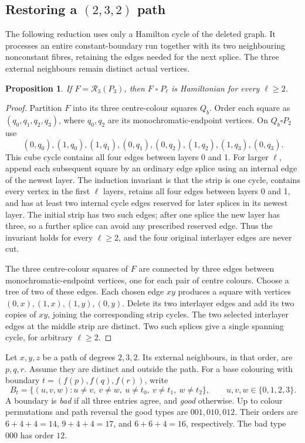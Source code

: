 \documentclass[11pt]{article}
\newtheorem{proposition}[theorem]{Proposition}
\theoremstyle{remark}
\newcommand{\R}{\mathcal R}
\numberwithin{equation}{section}
\numberwithin{table}{section}
\begin{document}
\subsection{\texorpdfstring{Restoring a $(2,3,2)$ path}{Restoring a (2,3,2) path}}
The following reduction uses only a Hamilton cycle of the deleted graph.
It processes an entire constant-boundary run together with its two
neighbouring nonconstant fibres, retaining the edges needed for the next
splice.  The three external neighbours remain distinct actual vertices.
\begin{proposition}\label{prop:badrun}
If $F=\R_3(P_3)$, then $F\mathbin{\square}P_\ell$ is Hamiltonian
for every $\ell\ge2$.
\end{proposition}
\begin{proof}
Partition $F$ into its three centre-colour squares $Q_b$.
Order each square as $(q_0,q_1,q_2,q_3)$, where $q_0,q_2$ are
its monochromatic-endpoint vertices. On $Q_b\square P_2$ use
\[
 (0,q_0),(1,q_0),(1,q_1),(0,q_1),
 (0,q_2),(1,q_2),(1,q_3),(0,q_3).
\]
This cube cycle contains all four edges between layers 0 and 1.
For larger $\ell$, append each subsequent square by an ordinary
edge splice using an internal edge of the newest layer.  The induction
invariant is that the strip is one cycle, contains every vertex in the
first $\ell$ layers, retains all four edges between layers 0 and 1,
and has at least two internal cycle edges reserved for later splices in its
newest layer.  The
initial strip has two such edges; after one splice the new layer has
three, so a further splice can avoid any prescribed reserved edge.
Thus the invariant holds for every $\ell\ge2$, and the four original
interlayer edges are never cut.

The three centre-colour squares of $F$ are connected by three edges
between monochromatic-endpoint vertices, one for each pair of
centre colours. Choose a tree of two of these edges. Each chosen
edge $xy$ produces a square with vertices $(0,x),(1,x),(1,y),(0,y)$.
Delete its two interlayer edges and add its two copies of $xy$,
joining the corresponding strip cycles. The two selected interlayer
edges at the middle strip are distinct. Two such splices give a
single spanning cycle, for arbitrary $\ell\ge2$.
\end{proof}

Let $x,y,z$ be a path of degrees $2,3,2$.  Its external neighbours, in
that order, are $p,q,r$.  Assume they are distinct and outside the path.
For a base colouring with boundary $t=(f(p),f(q),f(r))$, write
\[
 B_t=\{(u,v,w):u\ne v,\ v\ne w,\ u\ne t_0,\ v\ne t_1,
                  \ w\ne t_2\},\qquad u,v,w\in\{0,1,2,3\}.
\]
A boundary is \emph{bad} if all three entries agree, and \emph{good}
otherwise. Up to colour permutations and path reversal the good types
are $001,010,012$. Their orders are $6+4+4=14$, $9+4+4=17$, and
$6+6+4=16$, respectively. The bad type $000$ has order $12$.
\end{document}
